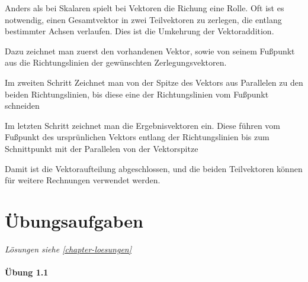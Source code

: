 \begin{mdframed}[backgroundcolor=SRH_Warm_Grey!50,skipabove=3em,skipbelow=1em,frametitle=Exkurs: Vektorzerlegung mit dem Vektorenparallelogramm] 
Anders als bei Skalaren spielt bei Vektoren die Richung eine Rolle. Oft ist es notwendig, einen Gesamtvektor in zwei Teilvektoren zu zerlegen, die entlang bestimmter Achsen verlaufen. Dies ist die Umkehrung der Vektoraddition.

Dazu zeichnet man zuerst den vorhandenen Vektor, sowie von seinem Fußpunkt aus die Richtungslinien der gewünschten Zerlegungsvektoren.  


Im zweiten Schritt Zeichnet man von der Spitze des Vektors aus Parallelen zu den beiden Richtungslinien, bis diese eine der Richtungslinien vom Fußpunkt schneiden


Im letzten Schritt zeichnet man die Ergebnisvektoren ein. Diese führen vom Fußpunkt des ursprünlichen Vektors entlang der Richtungslinien bis zum Schnittpunkt mit der Parallelen von der Vektorspitze



Damit ist die Vektoraufteilung abgeschlossen, und die beiden Teilvektoren können für weitere Rechnungen verwendet werden.
\end{mdframed}

\section{Übungsaufgaben}
\emph{Lösungen siehe \ref{chapter-loesungen}}

\paragraph{Übung 1.1}

